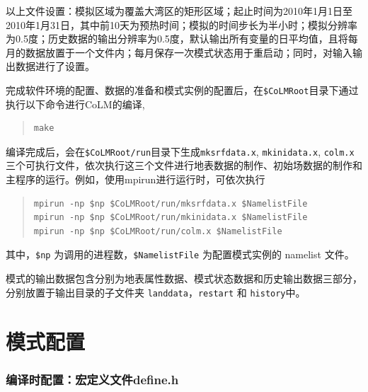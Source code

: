 \documentclass[a4paper,12pt,twoside]{article}
\begin{document}
以上文件设置：模拟区域为覆盖大湾区的矩形区域；起止时间为2010年1月1日至2010年1月31日，其中前10天为预热时间；模拟的时间步长为半小时；模拟分辨率为0.5度；历史数据的输出分辨率为0.5度，默认输出所有变量的日平均值，且将每月的数据放置于一个文件内；每月保存一次模式状态用于重启动；同时，对输入输出数据进行了设置。

完成软件环境的配置、数据的准备和模式实例的配置后，在\texttt{\$CoLMRoot}目录下通过执行以下命令进行CoLM的编译,
\begin{quote}
\begin{lstlisting}
make
\end{lstlisting}
\end{quote}
编译完成后，会在\texttt{\$CoLMRoot/run}目录下生成\texttt{mksrfdata.x}, \texttt{mkinidata.x}, \texttt{colm.x} 三个可执行文件，依次执行这三个文件进行地表数据的制作、初始场数据的制作和主程序的运行。例如，使用mpirun进行运行时，可依次执行
\begin{quote}\label{runcolm}
\begin{lstlisting}
mpirun -np $np $CoLMRoot/run/mksrfdata.x $NamelistFile
mpirun -np $np $CoLMRoot/run/mkinidata.x $NamelistFile
mpirun -np $np $CoLMRoot/run/colm.x $NamelistFile
\end{lstlisting}
\end{quote}
其中，\verb|$np| 为调用的进程数，\verb|$NamelistFile| 为配置模式实例的 namelist 文件。

模式的输出数据包含分别为地表属性数据、模式状态数据和历史输出数据三部分，分别放置于输出目录的子文件夹 \texttt{landdata}，\texttt{restart} 和 \texttt{history}中。

\clearpage

\part{模式配置}

\section{编译时配置：宏定义文件define.h}\label{define.hux6587ux4ef6}
\end{document}
